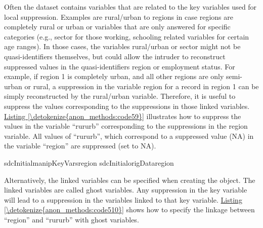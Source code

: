 \documentclass[letterpaper,10pt,english]{sphinxmanual}
\begin{document}
Often the dataset contains variables that are related to the key
variables used for local suppression. Examples are rural/urban to
regions in case regions are completely rural or urban or variables that
are only answered for specific categories (e.g., sector for those
working, schooling related variables for certain age ranges). In those
cases, the variables rural/urban or sector might not be
quasi-identifiers themselves, but could allow the intruder to
reconstruct suppressed values in the quasi-identifiers region or
employment status. For example, if region 1 is completely urban, and all
other regions are only semi-urban or rural, a suppression in the
variable region for a record in region 1 can be simply reconstructed by
the rural/urban variable. Therefore, it is useful to suppress the values
corresponding to the suppressions in those linked variables. \hyperref[\detokenize{anon_methods:code59}]{Listing \ref{\detokenize{anon_methods:code59}}}
illustrates how to suppress the values in the variable “rururb”
corresponding to the suppressions in the region variable. All values of
“rururb”, which correspond to a suppressed value (NA) in the variable
“region” are suppressed (set to NA).

\def\sphinxLiteralBlockLabel{\label{\detokenize{anon_methods:code59}}}
%
\begin{sphinxVerbatim}[commandchars=\\\{\},numbers=left,firstnumber=1,stepnumber=1]
 \PYG{p}{[}sdcInitialmanipKeyVarsregion 
      sdcInitialorigDataregion\PYG{p}{]}  
\end{sphinxVerbatim}

Alternatively, the linked variables can be specified when creating the
 object. The linked variables are called ghost variables. Any
suppression in the key variable will lead to a suppression in the
variables linked to that key variable. \hyperref[\detokenize{anon_methods:code510}]{Listing \ref{\detokenize{anon_methods:code510}}} shows how to specify
the linkage between “region” and “rururb” with ghost variables.
\end{document}
